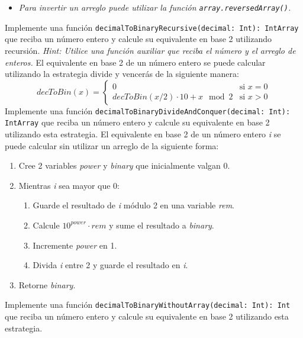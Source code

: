 \begin{Exercise}[title={Números binarios}]
\begin{itemize}
        \item \textit{Para invertir un arreglo puede utilizar la función 
          \texttt{array.reversedArray()}.}
      \end{itemize}
    \Question Implemente una función \texttt{decimalToBinaryRecursive(decimal: Int): IntArray} que 
      reciba un número entero y calcule su equivalente en base 2 utilizando recursión.
      \textit{Hint: Utilice una función auxiliar que reciba el número y el arreglo de enteros.}
    \Question El equivalente en base 2 de un número entero se puede calcular utilizando la estrategia
      divide y vencerás de la siguiente manera:
      \[
        \mathit{decToBin}(x) = \begin{cases}
          0 & \text{si } x = 0 \\
          \mathit{decToBin}(x / 2) \cdot 10 + x \mod 2 & \text{si } x > 0
        \end{cases}
      \]
      Implemente una función \texttt{decimalToBinaryDivideAndConquer(decimal: Int): IntArray} que 
      reciba un número entero y calcule su equivalente en base 2 utilizando esta estrategia.
    \Question El equivalente en base 2 de un número entero \textit{i} se puede calcular sin utilizar 
      un arreglo de la siguiente forma:
        \begin{enumerate}
          \item Cree 2 variables \textit{power} y \textit{binary} que inicialmente valgan 0.
          \item Mientras \textit{i} sea mayor que 0:
            \begin{enumerate}
              \item Guarde el resultado de \textit{i} módulo 2 en una variable \textit{rem}.
              \item Calcule \(10^{\mathit{power}} \cdot \mathit{rem}\) y sume el resultado a 
                \textit{binary}.
              \item Incremente \textit{power} en 1.
              \item Divida \textit{i} entre 2 y guarde el resultado en \textit{i}.
            \end{enumerate}
          \item Retorne \textit{binary}.
        \end{enumerate}
      Implemente una función \texttt{decimalToBinaryWithoutArray(decimal: Int): Int} que reciba un
      número entero y calcule su equivalente en base 2 utilizando esta estrategia.
  \end{Exercise}

